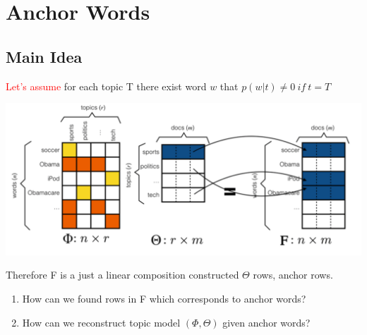 \documentclass{beamer}
\begin{document}
\section*{Anchor Words}
\subsection*{Main Idea}
\begin{frame}
	\textcolor{red}{Let's assume} for each topic T there exist word $w$ that $p(w| t) \neq 0~if~t = T$
	
	\begin{center}
		\includegraphics[scale=0.3]{img/anch_1}
	\end{center}
	
	Therefore F is a just a linear composition constructed  $\Theta$ rows, anchor rows.
	
	\begin{enumerate}
		\item How can we found rows in F which corresponds to anchor words?
		\item How can we reconstruct topic model $(\Phi, \Theta)$ given anchor words?
	\end{enumerate}
	
	
\end{frame}
\end{document}
